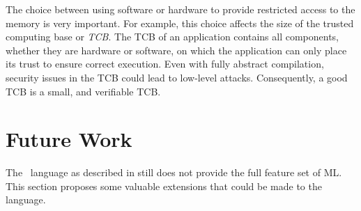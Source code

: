 The choice between using software or hardware to provide restricted access to the memory is very important.
For example, this choice affects the size of the trusted computing base or \emph{TCB}.
The TCB of an application contains all components, whether they are hardware or software, on which the application can only place its trust to ensure correct execution.
Even with fully abstract compilation, security issues in the TCB could lead to low-level attacks.
Consequently, a good TCB is a small, and verifiable TCB.

\section{Future Work}
\label{sec:FutureWork}
The \MiniML\ language as described in  still does not provide the full feature set of ML. This section proposes some valuable extensions that could be made to the language.

